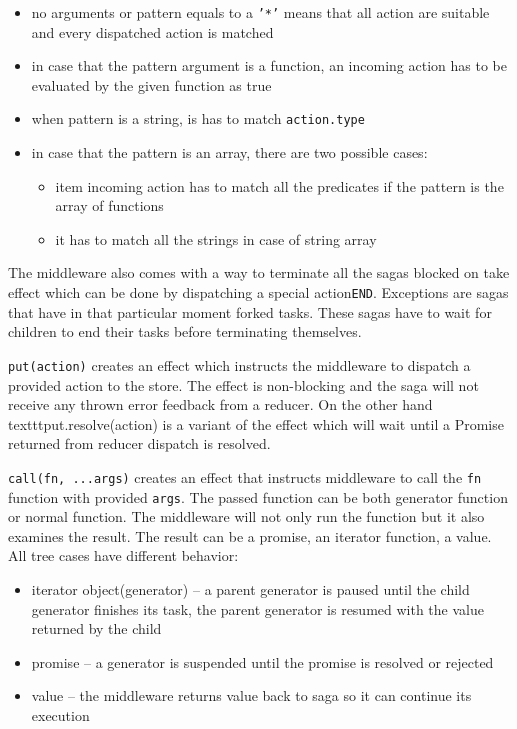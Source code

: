 \begin{itemize}
\item no arguments or pattern equals to a \texttt{'*'} means that all action are suitable and every dispatched action is matched
\item in case that the pattern argument is a function, an incoming action has to be evaluated by the given function as true
\item when pattern is a string, is has to match \texttt{action.type}
\item in case that the pattern is an array, there are two possible cases:

\begin{itemize}
\item item incoming action has to match all the 			predicates if the pattern is the array of functions
\item it has to match all the strings in case of string array
\end{itemize}  
\end{itemize}  

The middleware also comes with a way to terminate all the sagas blocked on take effect which can be done by dispatching a special action\texttt{END}. Exceptions are sagas that have in that particular moment forked tasks. These sagas have to wait for children to end their tasks before terminating themselves.

\texttt{put(action)} creates an effect which instructs the middleware to dispatch a provided action to the store. The effect is non-blocking and the saga will not receive any thrown error feedback from a reducer. On the other hand texttt{put.resolve(action)} is a variant of the effect which will wait until a Promise returned from reducer dispatch is resolved.

\texttt{call(fn, ...args)} creates an effect that instructs middleware to call the \texttt{fn} function with provided \texttt{args}. The passed function can be both generator function or normal function. The middleware will not only run the function but it also examines the result. The result can be a promise, an iterator function, a value. All tree cases have different behavior:
\begin{itemize}
\item iterator object(generator) -- a parent generator is paused until the child generator finishes its task, the parent generator is resumed with the value returned by the child
\item promise -- a generator is  suspended until the promise is resolved or rejected
\item value -- the middleware returns value back to saga so it can continue its execution
\end{itemize}  

